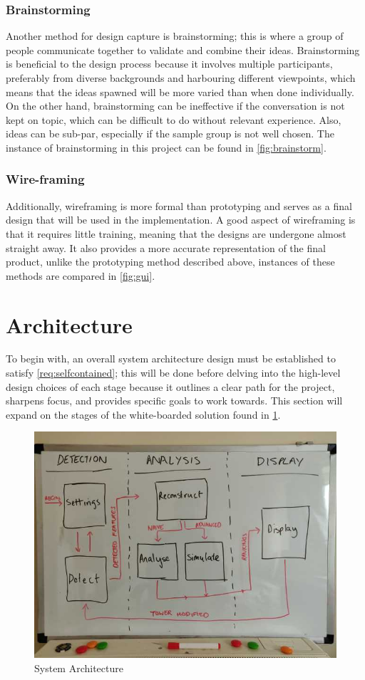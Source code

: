 \subsubsection{Brainstorming}
Another method for design capture is brainstorming; this is where a group of people communicate together to validate and combine their ideas. Brainstorming is beneficial to the design process because it involves multiple participants, preferably from diverse backgrounds and harbouring different viewpoints, which means that the ideas spawned will be more varied than when done individually. On the other hand, brainstorming can be ineffective if the conversation is not kept on topic, which can be difficult to do without relevant experience. Also, ideas can be sub-par, especially if the sample group is not well chosen. The instance of brainstorming in this project can be found in \cref{fig:brainstorm}.

\subsubsection{Wire-framing}
Additionally, wireframing is more formal than prototyping and serves as a final design that will be used in the implementation. A good aspect of wireframing is that it requires little training, meaning that the designs are undergone almost straight away. It also provides a more accurate representation of the final product, unlike the prototyping method described above, instances of these methods are compared in \cref{fig:gui}.

\section{Architecture}

To begin with, an overall system architecture design must be established to satisfy \cref{req:selfcontained}; this will be done before delving into the high-level design choices of each stage because it outlines a clear path for the project, sharpens focus, and provides specific goals to work towards. This section will expand on the stages of the white-boarded solution found in \cref{fig:architecture}.

\begin{figure}
    \centering
    \includegraphics[width=0.6\linewidth]{images/design/architecture}
    \caption{System Architecture}
    \label{fig:architecture}
\end{figure}

